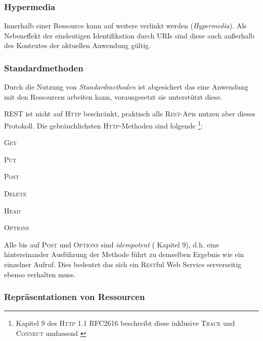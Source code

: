 \subsubsection{Hypermedia}
\label{sec:hypermedia}

Innerhalb einer Ressource kann auf weitere verlinkt werden (\emph{Hypermedia}). Als Nebeneffekt der eindeutigen Identifikation durch \glspl{URI} sind diese auch außerhalb des Kontextes der aktuellen Anwendung gültig. 


\subsubsection{Standardmethoden}
\label{sec:standardmethods}

Durch die Nutzung von \emph{Standardmethoden} ist abgesichert das eine Anwendung mit den Ressourcen arbeiten kann, vorausgesetzt sie unterstützt diese. 

\gls{REST} ist nicht auf \textsc{Http} beschränkt, praktisch alle \textsc{Rest}-\textsc{Api}s nutzen aber dieses Protokoll. Die gebräuchlichsten \textsc{Http}-Methoden sind folgende \footnote{Kapitel 9 des \textsc{Http} 1.1 RFC2616 beschreibt diese inklusive \textsc{Trace} und \textsc{Connect} umfassend \cite{rfc2616}}:
\begin{compactitem}
    \item \textsc{Get}
    \item \textsc{Put}
    \item \textsc{Post}
    \item \textsc{Delete}
    \item \textsc{Head}
    \item \textsc{Options}
\end{compactitem}

Alle bis auf \textsc{Post} und \textsc{Options} sind \emph{idempotent} (\cite{rfc2616} Kapitel 9), d.h. eine hintereinander Ausführung der Methode führt zu demselben Ergebnis wie ein einzelner Aufruf. Dies bedeutet das sich ein \textsc{Rest}ful Web Service serverseitig ebenso verhalten muss.

\subsubsection{Repräsentationen von Ressourcen}
\label{sec:representationofresources}

